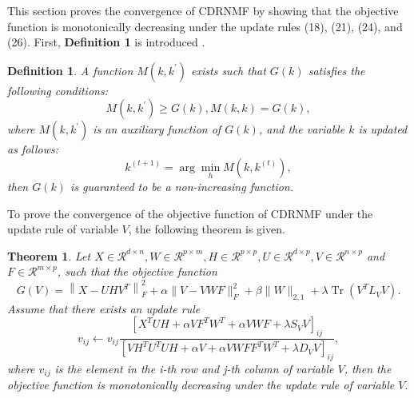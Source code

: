 \documentclass[a4paper,fleqn]{cas-sc}
\newtheorem{theorem}{Theorem}
\newtheorem{definition}{Definition}
\begin{document}
This section proves the convergence of CDRNMF by showing that the objective function is monotonically decreasing under the update rules (18), (21), (24), and (26). First, \textbf{Definition 1} is introduced \cite{7}.

\begin{definition}
	A function $M\left(k, k^{\prime}\right)$ exists such that $G(k)$ satisfies the following conditions:
	\begin{equation}
		M\left(k, k^{\prime}\right) \geq G(k), M(k, k)=G(k),
	\end{equation} 
	where $M\left(k, k^{\prime}\right)$ is an auxiliary function of $G(k)$, and the variable $k$ is updated as follows:
	\begin{equation}
		k^{(t+1)}=\arg \min _h M\left(k, k^{(t)}\right),
	\end{equation}
	then $G(k)$ is guaranteed to be a non-increasing function.
\end{definition}

To prove the convergence of the objective function of CDRNMF under the update rule of variable $V$, the following theorem is given.

\begin{theorem}
	Let $X \in \mathcal{R}^{d \times n}, W \in \mathcal{R}^{p \times m}, H \in \mathcal{R}^{p \times p}, U \in \mathcal{R}^{d \times p}, V \in \mathcal{R}^{n \times p}$ and $F \in \mathcal{R}^{m \times p}$, such that the objective function
	\begin{equation}
		G(V)=\left\|X-U H V^T\right\|_F^2+\alpha\|V-V W F\|_F^2+\beta\|W\|_{2,1}+\lambda \operatorname{Tr}\left(V^T L_V V\right). 
	\end{equation}
	Assume that there exists an update rule
	\begin{equation}
		v_{i j} \leftarrow v_{i j} \frac{\left[X^T U H+\alpha V F^T W^T+\alpha V W F+\lambda S_V V\right]_{i j}}{\left[V H^T U^T U H+\alpha V+\alpha V W F F^T W^T+\lambda D_V V\right]_{i j}},
	\end{equation}
	where $v_{i j}$ is the element in the i-th row and j-th column of variable $V$, then the objective function is monotonically decreasing under the update rule of variable $V$.
\end{theorem}
\end{document}
